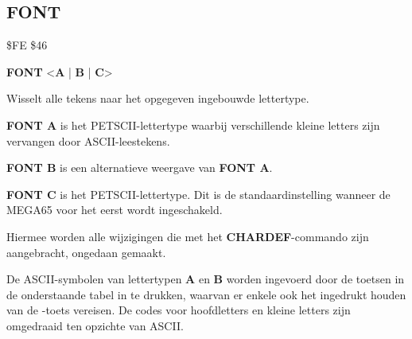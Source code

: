 \subsection{FONT}
\begin{description}[leftmargin=2cm,style=nextline]
\item [Token:]    \$FE \$46
\item [Formaat:]   {\bf FONT} <{\bf A} | {\bf B} | {\bf C}>\item [Gebruik:]    Wisselt alle tekens naar het opgegeven ingebouwde lettertype.

                  {\bf FONT A} is het PETSCII-lettertype waarbij verschillende kleine letters zijn vervangen door ASCII-leestekens.

                  {\bf FONT B} is een alternatieve weergave van {\bf FONT A}.

                  {\bf FONT C} is het PETSCII-lettertype. Dit is de standaardinstelling wanneer de MEGA65 voor het eerst wordt ingeschakeld.

                  Hiermee worden alle wijzigingen die met het {\bf CHARDEF}-commando zijn aangebracht, ongedaan gemaakt.

                  De ASCII-symbolen van lettertypen {\bf A} en {\bf B} worden ingevoerd door de toetsen in de onderstaande tabel in te drukken, waarvan er enkele ook het ingedrukt houden van de \megasymbolkey-toets vereisen. De codes voor hoofdletters en kleine letters zijn omgedraaid ten opzichte van ASCII.

                  \begin{center}
                  {}
                  \end{center}


\end{description}
